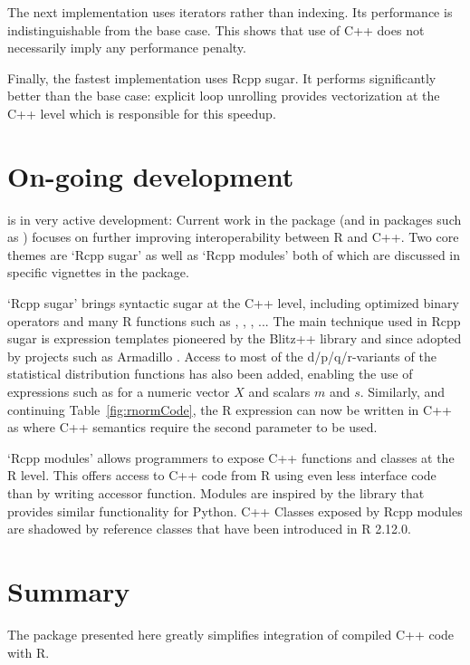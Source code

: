 The next implementation uses iterators rather than indexing. Its performance
is indistinguishable from the base case. 
This shows that use of C++ does not necessarily imply any performance penalty.

Finally, the fastest implementation uses Rcpp sugar. It performs
significantly better than the base case: explicit loop unrolling provides
vectorization at the C++ level which is responsible for this speedup.  

\section{On-going development}

 is in very active development: Current work in the
package (and in packages such as )
focuses on further improving interoperability between R and C++. 
Two core themes are `Rcpp sugar' as well as `Rcpp modules' both of which are
discussed in specific vignettes in the package.  

`Rcpp sugar' brings syntactic
sugar at the C++ level, including optimized binary operators and many 
R functions such as , , , ... 
The main technique used in Rcpp sugar is
expression templates pioneered by the Blitz++ library \citep{Blitz}
and since adopted 
by projects such as Armadillo \citep{Armadillo}. 
Access to most of the d/p/q/r-variants of the statistical distribution
functions has also been added, enabling the use of expressions such as 
 for a numeric vector $X$ and scalars $m$ and
$s$. Similarly, and continuing Table~\ref{fig:rnormCode},  the R expression
 can now be written in C++ as  where C++ semantics require the second parameter to be used. 

`Rcpp modules' allows programmers to expose C++ functions and classes 
at the R level. This offers access to C++ code from R using even less
interface code than by writing accessor function. Modules are inspired by
the  library 
\citep{Boost:Python} that provides similar functionality for Python. C++ Classes
exposed by Rcpp modules are shadowed by reference classes that have been 
introduced in R 2.12.0. 


\section{Summary}

The  package presented here greatly simplifies integration of
compiled C++ code with R.

